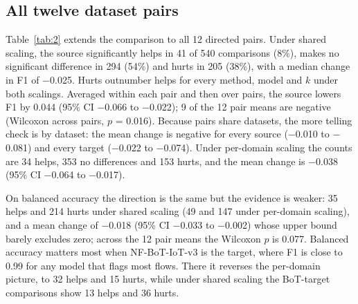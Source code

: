 \documentclass[11pt]{article}
\begin{document}
\subsection{All twelve dataset pairs}

Table~\ref{tab:2} extends the comparison to all 12 directed pairs. Under shared scaling, the source significantly helps in 41 of 540 comparisons (8\%), makes no significant difference in 294 (54\%) and hurts in 205 (38\%), with a median change in F1 of $-$0.025. Hurts outnumber helps for every method, model and $k$ under both scalings. Averaged within each pair and then over pairs, the source lowers F1 by 0.044 (95\% CI $-$0.066 to $-$0.022); 9 of the 12 pair means are negative (Wilcoxon across pairs, $p$ = 0.016). Because pairs share datasets, the more telling check is by dataset: the mean change is negative for every source ($-$0.010 to $-$0.081) and every target ($-$0.022 to $-$0.074). Under per-domain scaling the counts are 34 helps, 353 no differences and 153 hurts, and the mean change is $-$0.038 (95\% CI $-$0.064 to $-$0.017).

On balanced accuracy the direction is the same but the evidence is weaker: 35 helps and 214 hurts under shared scaling (49 and 147 under per-domain scaling), and a mean change of $-$0.018 (95\% CI $-$0.033 to $-$0.002) whose upper bound barely excludes zero; across the 12 pair means the Wilcoxon $p$ is 0.077. Balanced accuracy matters most when NF-BoT-IoT-v3 is the target, where F1 is close to 0.99 for any model that flags most flows. There it reverses the per-domain picture, to 32 helps and 15 hurts, while under shared scaling the BoT-target comparisons show 13 helps and 36 hurts.
\end{document}
